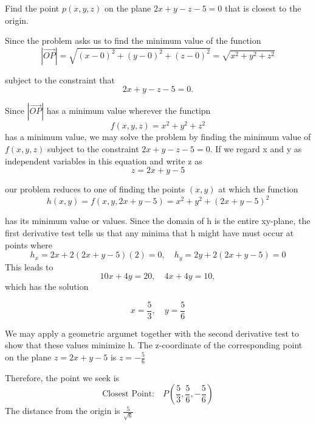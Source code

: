 \documentclass[12pt,a4paper,draft]{article}
\begin{document}
\begin{example}
    Find the point \(p(x,y,z)\) on the plane \(2x + y  -z -5 = 0\) that is closest to the origin.

    \begin{solution}
        Since the problem asks us to find the minimum value of the function
        \[\left|\overrightarrow{OP}\right| = \sqrt{(x-0)^2 + (y-0)^2 + (z- 0)^2} = \sqrt{x^2 + y^2 + z^2}  \]



        subject to the constraint that
        \[2x + y -z - 5 =0.\]

        Since \(\left|\overrightarrow{OP}\right|\) has a minimum value wherever the functipn
        \[f(x,y,z) = x^2 + y^2 + z^2\]
        has a minimum value, we may solve the problem by finding the minimum value of \(f(x,y,z)\) subject to the constraint \(2x + y - z -5 = 0\). If we regard x and y as independent variables in this equation and write z as
        \[z = 2x + y - 5\]

        our problem reduces to one of finding the points \((x,y)\) at which the function
        \[h(x,y) = f(x,y, 2x + y -5) = x^2 + y^2 + (2x + y -5)^2\]

        has its minimum value or values. Since the domain of h is the entire xy-plane, the first derivative test tells us that any minima that h might have must occur at points where
        \[h_x = 2x + 2(2x+ y -5)(2) = 0, \quad h_y = 2y + 2(2x+y-5) = 0\]
        This leads to 
        \[10x + 4y = 20, \quad 4x + 4y = 10,\]
        which has the solution

        \[x = \frac{5}{3}, \quad y = \frac56\]

        We may apply a geometric argumet together with the second derivative test to show that these values minimize h. The z-coordinate of the corresponding point on the plane \(z = 2x + y -5\) is \(z = -\frac56\)

        Therefore, the point we seek is 
        \[\text{Closest Point:} \quad P \left(\frac53,\frac56,-\frac56\right)\]
        The distance from the origin is \(\frac{5}{\sqrt{6}}\)





    \end{solution}

   
\end{example}
\end{document}
